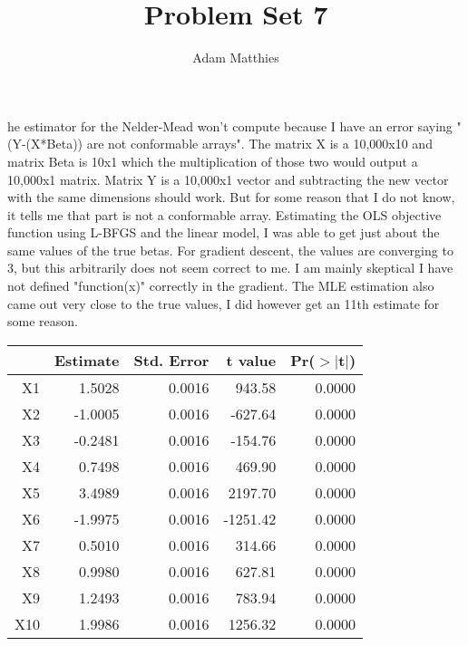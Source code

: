 \documentclass[12pt]{article}
\newenvironment{statement}[2][Statement]{\begin{trivlist}
\item[\hskip \labelsep {\bfseries #1}\hskip \labelsep {\bfseries #2.}]}{\end{trivlist}}
\begin{document}
 
%
%
 
\title{Problem Set 7} %
\author{Adam Matthies} %
\maketitle


\begin{statement}

The estimator for the Nelder-Mead won't compute because I have an error saying "(Y-(X*Beta)) are
not conformable arrays". The matrix X is a 10,000x10 and matrix Beta is 10x1 which the multiplication
of those two would output a 10,000x1 matrix. Matrix Y is a 10,000x1 vector and subtracting the new
vector with the same dimensions should work. But for some reason that I do not know, it tells me
that part is not a conformable array. Estimating the OLS objective function using L-BFGS and the
linear model, I was able to get just about the same values of the true betas. For gradient descent,
the values are converging to 3, but this arbitrarily does not seem correct to me. I am mainly skeptical I have not defined "function(x)" correctly in the gradient. The MLE estimation also came
out very close to the true values, I did however get an 11th estimate for some reason.

\end{statement}
 
\begin{table}[ht]
\centering
\begin{tabular}{rrrrr}
  \hline
 & Estimate & Std. Error & t value & Pr($>$$|$t$|$) \\ 
  \hline
X1 & 1.5028 & 0.0016 & 943.58 & 0.0000 \\ 
  X2 & -1.0005 & 0.0016 & -627.64 & 0.0000 \\ 
  X3 & -0.2481 & 0.0016 & -154.76 & 0.0000 \\ 
  X4 & 0.7498 & 0.0016 & 469.90 & 0.0000 \\ 
  X5 & 3.4989 & 0.0016 & 2197.70 & 0.0000 \\ 
  X6 & -1.9975 & 0.0016 & -1251.42 & 0.0000 \\ 
  X7 & 0.5010 & 0.0016 & 314.66 & 0.0000 \\ 
  X8 & 0.9980 & 0.0016 & 627.81 & 0.0000 \\ 
  X9 & 1.2493 & 0.0016 & 783.94 & 0.0000 \\ 
  X10 & 1.9986 & 0.0016 & 1256.32 & 0.0000 \\ 
   \hline
\end{tabular}
\end{table}
\end{document}
